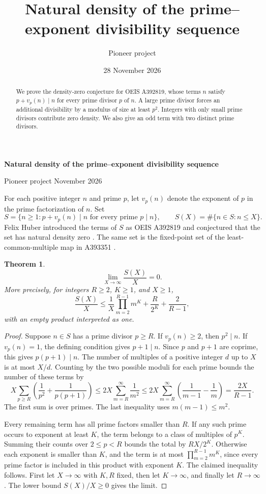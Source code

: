 \documentclass[10pt,letterpaper]{article}
\title{Natural density of the prime--exponent divisibility sequence}
\author{Pioneer project}
\date{28 November 2026}
\newtheorem{theorem}{Theorem}
\begin{document}
\begin{center}
{\Large\bfseries Natural density of the prime--exponent divisibility sequence}\par\smallskip
Pioneer project  November 2026
\end{center}

\begin{abstract}
We prove the density-zero conjecture for OEIS A392819, whose terms \(n\)
satisfy \(p+v_p(n)\mid n\) for every prime divisor \(p\) of \(n\).
A large prime divisor forces an additional divisibility by a modulus of
size at least \(p^2\). Integers with only small prime divisors contribute
zero density. We also give an odd term with two distinct prime divisors.
\end{abstract}

For each positive integer \(n\) and prime \(p\), let \(v_p(n)\) denote
the exponent of \(p\) in the prime factorization of \(n\). Set
\[
  S=\{n\ge 1 : p+v_p(n)\mid n \text{ for every prime }p\mid n\},
  \qquad S(X)=\#\{n\in S: n\le X\}.
\]
Felix Huber introduced the terms of \(S\) as OEIS A392819 and conjectured
that the set has natural density zero \cite{a392819}. The same set is
the fixed-point set of the least-common-multiple map in A393351
\cite{a393351}.

\begin{theorem}
\[
  \lim_{X\to\infty}\frac{S(X)}{X}=0.
\]
More precisely, for integers \(R\ge 2\), \(K\ge 1\), and \(X\ge 1\),
\[
 \frac{S(X)}{X}
 \le \frac{1}{X}\prod_{m=2}^{R-1}m^K
      +\frac{R}{2^K}+\frac{2}{R-1},
\]
with an empty product interpreted as one.
\end{theorem}

\begin{proof}
Suppose \(n\in S\) has a prime divisor \(p\ge R\). If \(v_p(n)\ge 2\),
then \(p^2\mid n\). If \(v_p(n)=1\), the defining condition gives
\(p+1\mid n\). Since \(p\) and \(p+1\) are coprime, this gives
\(p(p+1)\mid n\). The number of multiples of a positive integer \(d\)
up to \(X\) is at most \(X/d\). Counting by the two possible moduli
for each prime bounds the number of these terms by
\[
 X\sum_{p\ge R}\left(\frac1{p^2}+\frac1{p(p+1)}\right)
 \le 2X\sum_{m=R}^{\infty}\frac1{m^2}
 \le 2X\sum_{m=R}^{\infty}
   \left(\frac1{m-1}-\frac1m\right)
 =\frac{2X}{R-1}.
\]
The first sum is over primes. The last inequality uses
\(m(m-1)\le m^2\).

Every remaining term has all prime factors smaller than \(R\).
If any such prime occurs to exponent at least \(K\), the term belongs
to a class of multiples of \(p^K\). Summing their counts over
\(2\le p<R\) bounds the total by \(RX/2^K\). Otherwise each exponent
is smaller than \(K\), and the term is at most
\(\prod_{m=2}^{R-1}m^K\), since every prime factor is included in
this product with exponent \(K\). The claimed inequality follows.
First let \(X\to\infty\) with \(K,R\) fixed, then let \(K\to\infty\),
and finally let \(R\to\infty\). The lower bound \(S(X)/X\ge 0\)
gives the limit.
\end{proof}
\end{document}

